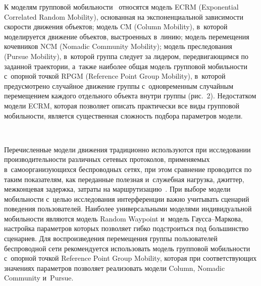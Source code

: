 \begin{multicols}{2}
  К моделям групповой мо\-биль\-ности~\cite{10-sg, 11-sg} относятся модель 
ECRM (Exponential Correlated Random Mobility), основанная на 
экспоненциальной за\-ви\-си\-мости ско\-рости движения объектов; модель CM 
(Column Mobility), в~которой моделируется движение объектов, вы\-стро\-ен\-ных 
в~линию; модель перемещения кочевников NCM (Nomadic Community 
Mobility); модель преследования (Pursue Mobility),\linebreak
 в~которой группа следует 
за лидером, пе\-ре\-дви\-гающимся по заданной траектории, а~также на\-и\-более 
общая модель групповой мо\-биль\-ности\linebreak
 с~опорной точ\-кой RPGM (Reference 
Point Group Mobility), в~которой пред\-усмот\-ре\-но случайное движение группы 
с~одновременным случайным перемещением каждого отдельного объекта 
внут\-ри группы (рис.~2). Недостатком модели ECRM, которая позволяет 
описать практически все виды групповой мо\-биль\-ности, является 
существенная слож\-ность подбора па\-ра\-мет\-ров модели.

\begin{figure*} %
\vspace*{1pt}
 \begin{center}
 \mbox{%
 \epsfxsize=158.36mm 
 }
 \end{center}
\vspace*{-11pt}
\vspace*{-4pt}
\end{figure*}

  Перечисленные модели движения традиционно используются при 
исследовании про\-из\-во\-ди\-тель\-ности различных сетевых протоколов, 
при\-ме\-ня\-емых в~са\-мо\-ор\-га\-низу\-ющих\-ся беспроводных сетях, при этом 
сравнение проводится по таким показателям, как переданные полезная 
и~служебная на\-груз\-ка, джиттер, межконцевая за\-держ\-ка, за\-тра\-ты на 
маршрутизацию~\cite{11-sg}. При выборе модели мо\-биль\-ности с~целью 
исследования интерференции важно учитывать сценарий поведения 
пользователей. Наиболее универсальными моделями индивидуальной 
мо\-биль\-ности являются модель Random Waypoint и~модель  
Гаус\-са--Мар\-ко\-ва, настройка па\-ра\-мет\-ров которых позволяет гиб\-ко 
под\-стро\-ить\-ся под большинство сценариев. Для воспроизведения 
перемещения группы пользователей беспроводной сети рекомендуется 
использовать модель групповой мо\-биль\-ности с~опорной точ\-кой Reference 
Point Group Mobility, которая при со\-от\-вет\-ст\-ву\-ющих значениях па\-ра\-мет\-ров 
позволяет реализовать модели Column, Nomadic Community и~Pursue. 


\end{multicols}
